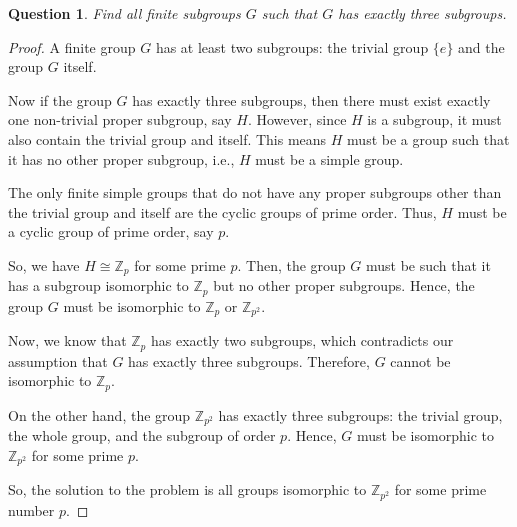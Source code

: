 \documentclass{amsart}
\theoremstyle{plain}
\newtheorem{question}{Question}
\begin{document}
\begin{question}
    Find all finite subgroups $G$ such that $G$ has exactly three subgroups.
\end{question}
\begin{proof}A finite group $G$ has at least two subgroups: the trivial group $\{e\}$ and the group $G$ itself.

Now if the group $G$ has exactly three subgroups, then there must exist exactly one non-trivial proper subgroup, say $H$. However, since $H$ is a subgroup, it must also contain the trivial group and itself. This means $H$ must be a group such that it has no other proper subgroup, i.e., $H$ must be a simple group.

The only finite simple groups that do not have any proper subgroups other than the trivial group and itself are the cyclic groups of prime order. Thus, $H$ must be a cyclic group of prime order, say $p$. 

So, we have $H \cong \mathbb{Z}_p$ for some prime $p$. Then, the group $G$ must be such that it has a subgroup isomorphic to $\mathbb{Z}_p$ but no other proper subgroups. Hence, the group $G$ must be isomorphic to $\mathbb{Z}_p$ or $\mathbb{Z}_{p^2}$.

Now, we know that $\mathbb{Z}_p$ has exactly two subgroups, which contradicts our assumption that $G$ has exactly three subgroups. Therefore, $G$ cannot be isomorphic to $\mathbb{Z}_p$.

On the other hand, the group $\mathbb{Z}_{p^2}$ has exactly three subgroups: the trivial group, the whole group, and the subgroup of order $p$. Hence, $G$ must be isomorphic to $\mathbb{Z}_{p^2}$ for some prime $p$.

So, the solution to the problem is all groups isomorphic to $\mathbb{Z}_{p^2}$ for some prime number $p$.\end{proof}
\end{document}
